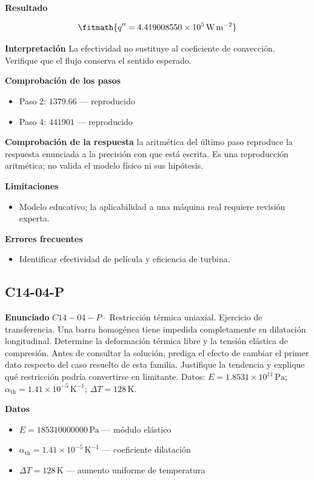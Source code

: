 \documentclass[10pt,openany]{book}
\begin{document}
\noindent\textbf{Resultado}

\[
\fitmath{q''=4.419008550\times10^{5}\,\mathrm{W}\,\mathrm{m}^{-2}}
\]

\noindent\textbf{Interpretación}
La efectividad no sustituye al coeficiente de convección. Verifique que el flujo conserva el sentido esperado.

\noindent\textbf{Comprobación de los pasos}
\begin{itemize}
\item Paso 2: $1379.66$ — reproducido
\item Paso 4: $441901$ — reproducido
\end{itemize}

\noindent\textbf{Comprobación de la respuesta} la aritmética del último paso reproduce la respuesta enunciada a la precisión con que está escrita. Es una reproducción aritmética; no valida el modelo físico ni sus hipótesis.

\noindent\textbf{Limitaciones}
\begin{itemize}
\item Modelo educativo; la aplicabilidad a una máquina real requiere revisión experta.
\end{itemize}

\noindent\textbf{Errores frecuentes}
\begin{itemize}
\item Identificar efectividad de película y eficiencia de turbina.
\end{itemize}
\subsection*{C14-04-P}

\noindent\textbf{Enunciado}
\(C14-04-P \cdot\) Restricción térmica uniaxial. Ejercicio de transferencia. Una barra homogénea tiene impedida completamente su dilatación longitudinal. Determine la deformación térmica libre y la tensión elástica de compresión. Antes de consultar la solución, prediga el efecto de cambiar el primer dato respecto del caso resuelto de esta familia. Justifique la tendencia y explique qué restricción podría convertirse en limitante. Datos: \(E=1.8531\times 10^{11}\, \mathrm{Pa}\); \(\alpha_{\mathrm{th}}=1.41\times 10^{-5}\, \mathrm{K}^{-1}\); \(\Delta T=128\, \mathrm{K}\).

\noindent\textbf{Datos}
\begin{itemize}
\item $E = 185310000000\,\mathrm{Pa}$ — módulo elástico
\item $\alpha_{\mathrm{th}} = 1.41\times 10^{-5}\,\mathrm{K}^{-1}$ — coeficiente dilatación
\item $\Delta T = 128\,\mathrm{K}$ — aumento uniforme de temperatura
\end{itemize}
\end{document}
